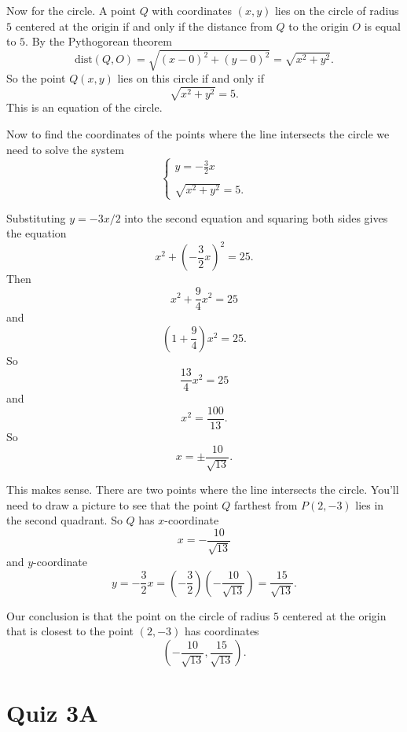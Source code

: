 \documentclass{ximera}
\begin{document}
\begin{question}
\begin{explanation}
Now for the circle. A point $Q$ with coordinates $(x,y)$ lies on the circle of radius $5$ centered at the origin if and only if the distance from $Q$ to the origin $O$ is equal to $5$. By the Pythogorean theorem
\[
  \text{dist}(Q,O) = \sqrt{(x-0)^2 + (y-0)^2} = \sqrt{x^2 + y^2}.
\]
So the point $Q(x,y)$ lies on this circle if and only if
\[
     \sqrt{x^2 + y^2} = 5.
\]
This is an equation of the circle.

Now to find the coordinates of the points where the line intersects the circle we need to solve the system
\[
\begin{cases}
        y = -\frac{3}{2}x  \\ \\
         \sqrt{x^2 + y^2} =  5 .
\end{cases}
\]

Substituting $y=-3x/2$ into the second equation and squaring both sides gives the equation
\[
     x^2 + \left(  -\frac{3}{2}x\right)^2 = 25.
\]
Then
\[
     x^2 + \frac{9}{4}x^2 = 25
\]
and
\[
\left( 1 + \frac{9}{4} \right) x^2 = 25.
\]
So
\[
   \frac{13}{4}x^2 = 25
\]
and
\[
     x^2 = \frac{100}{13} .
\]
So 
\[
    x = \pm \frac{10}{\sqrt{13}} .
\]

This makes sense. There are two points where the line intersects the circle. You'll need to draw a picture to see that the point $Q$ farthest from $P(2,-3)$ lies in the second quadrant. So $Q$ has $x$-coordinate
\[
     x = - \frac{10}{\sqrt{13}}
\]
and $y$-coordinate
\[
 y = -\frac{3}{2}x = \left( -\frac{3}{2} \right)  \left( - \frac{10}{\sqrt{13}} \right) = \frac{15}{\sqrt{13}} . 
\]

Our conclusion is that the point on the circle of radius $5$ centered at the origin that is closest to the point $(2,-3)$ has coordinates
\[
       \left(     - \frac{10}{\sqrt{13}} ,    \frac{15}{\sqrt{13}} \right) .
\]
\end{explanation}
\end{question}

\section{Quiz 3A}
\end{document}
